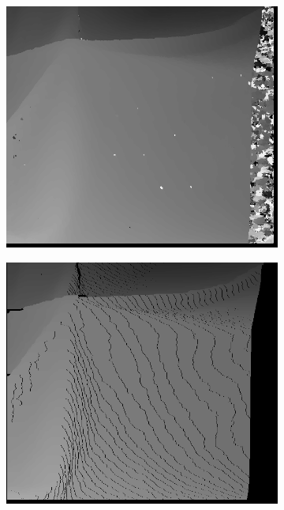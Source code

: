 \documentclass[11pt,a4paper]{article}
\begin{document}
\begin{figure}
    \centering
      \begin{subfigure}[b]{0.13\textwidth}
        \includegraphics[width=\textwidth]{figures/ssd_res5.png}
        \caption{}
        \label{subfig:A}
      \end{subfigure}
      \begin{subfigure}[b]{0.13\textwidth}
        \includegraphics[width=\textwidth]{figures/nofill_res5.png}

\end{subfigure}
\end{figure}
\end{document}
